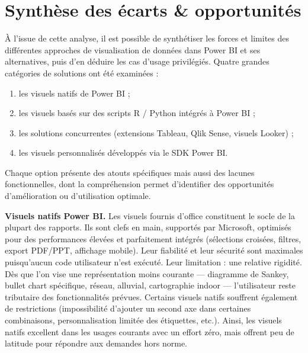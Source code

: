 \section{Synthèse des écarts \& opportunités}
\label{sec:synthese}

À l’issue de cette analyse, il est possible de synthétiser les forces et
limites des différentes approches de visualisation de données dans Power BI
et ses alternatives, puis d’en déduire les cas d’usage privilégiés. Quatre
grandes catégories de solutions ont été examinées :

\begin{enumerate}
  \item les visuels natifs de Power BI ;
  \item les visuels basés sur des scripts R / Python intégrés à Power BI ;
  \item les solutions concurrentes (extensions Tableau, Qlik Sense,
        visuels Looker) ;
  \item les visuels personnalisés développés via le SDK Power BI.
\end{enumerate}

Chaque option présente des atouts spécifiques mais aussi des lacunes
fonctionnelles, dont la compréhension permet d’identifier des opportunités
d’amélioration ou d’utilisation optimale.

\medskip
\textbf{Visuels natifs Power BI.}  
Les visuels fournis d’office constituent le socle de la plupart des
rapports. Ils sont clefs en main, supportés par Microsoft, optimisés pour
des performances élevées et parfaitement intégrés (sélections croisées,
filtres, export PDF/PPT, affichage mobile). Leur fiabilité et leur sécurité
sont maximales puisqu’aucun code utilisateur n’est exécuté. Leur
limitation : une relative rigidité. Dès que l’on vise une représentation
moins courante — diagramme de Sankey, bullet chart spécifique, réseau,
alluvial, cartographie indoor — l’utilisateur reste tributaire des
fonctionnalités prévues. Certains visuels natifs souffrent
également de restrictions (impossibilité d’ajouter un second axe dans
certaines combinaisons, personnalisation limitée des étiquettes, etc.).
Ainsi, les visuels natifs excellent dans les usages courants avec un effort
zéro, mais offrent peu de latitude pour répondre aux demandes hors norme.

